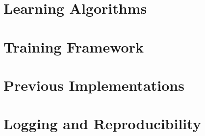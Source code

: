 \section{Learning Algorithms}

\section{Training Framework}

\section{Previous Implementations}

\section{Logging and Reproducibility}